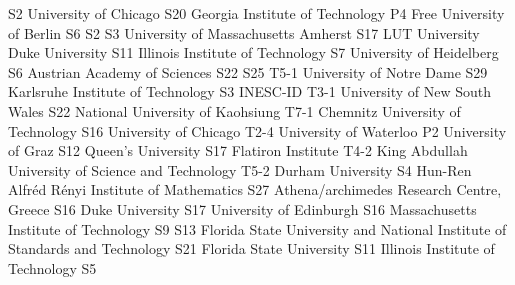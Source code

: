 \begin{multicols}{2}
{S2}
{}
{}
{}
{}
{}
{}
{University of Chicago}
{S20}
{}
{}
{}
{}
{}
{}
{Georgia Institute of Technology}
{P4}
{}
{}
{}
{}
{}
{}
{Free University of Berlin}
{S6}
{S2}
{S3}
{}
{}
{}
{}
{University of Massachusetts Amherst}
{S17}
{}
{}
{}
{}
{}
{}
{LUT University}
{}
{}
{}
{}
{}
{}
{}
{Duke University}
{S11}
{}
{}
{}
{}
{}
{}
{Illinois Institute of Technology}
{S7}
{}
{}
{}
{}
{}
{}
{University of Heidelberg}
{S6}
{}
{}
{}
{}
{}
{}
{Austrian Academy of Sciences}
{S22}
{S25}
{T5-1}
{}
{}
{}
{}
{University of Notre Dame}
{S29}
{}
{}
{}
{}
{}
{}
{Karlsruhe Institute of Technology}
{S3}
{}
{}
{}
{}
{}
{}
{INESC-ID}
{T3-1}
{}
{}
{}
{}
{}
{}
{University of New South Wales}
{S22}
{}
{}
{}
{}
{}
{}
{National University of Kaohsiung}
{T7-1}
{}
{}
{}
{}
{}
{}
{Chemnitz University of Technology}
{S16}
{}
{}
{}
{}
{}
{}
{University of Chicago}
{T2-4}
{}
{}
{}
{}
{}
{}
{University of Waterloo}
{P2}
{}
{}
{}
{}
{}
{}
{University of Graz}
{S12}
{}
{}
{}
{}
{}
{}
{Queen's University}
{S17}
{}
{}
{}
{}
{}
{}
{Flatiron Institute}
{T4-2}
{}
{}
{}
{}
{}
{}
{King Abdullah University of Science and Technology}
{T5-2}
{}
{}
{}
{}
{}
{}
{Durham University}
{S4}
{}
{}
{}
{}
{}
{}
{Hun-Ren Alfr\'ed R\'enyi Institute of Mathematics}
{S27}
{}
{}
{}
{}
{}
{}
{Athena/archimedes Research Centre, Greece}
{S16}
{}
{}
{}
{}
{}
{}
{Duke University}
{S17}
{}
{}
{}
{}
{}
{}
{University of Edinburgh}
{S16}
{}
{}
{}
{}
{}
{}
{Massachusetts Institute of Technology}
{S9}
{S13}
{}
{}
{}
{}
{}
{Florida State University and National Institute of Standards and Technology}
{S21}
{}
{}
{}
{}
{}
{}
{Florida State University}
{S11}
{}
{}
{}
{}
{}
{}
{Illinois Institute of Technology}
{S5}
{}
{}
{}
{}
{}
{}

\end{multicols}
